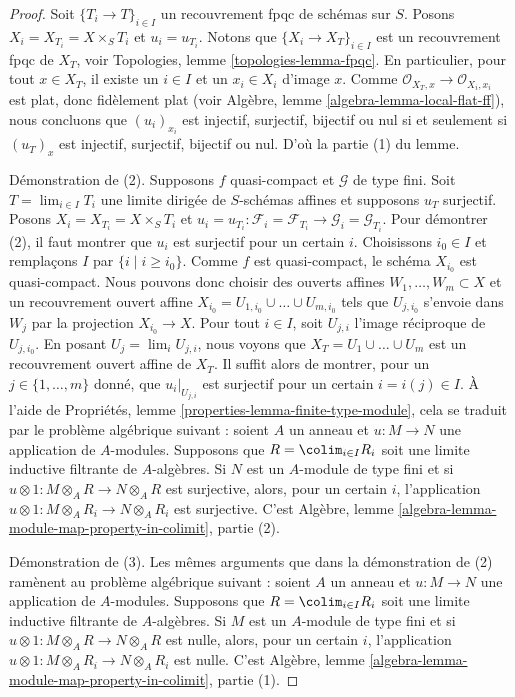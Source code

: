 \begin{proof}
Soit $\{T_i \to T\}_{i \in I}$ un recouvrement fpqc de schémas sur $S$.
Posons $X_i = X_{T_i} = X \times_S T_i$ et $u_i = u_{T_i}$.
Notons que $\{X_i \to X_T\}_{i \in I}$ est un recouvrement fpqc de $X_T$, voir
Topologies, lemme \ref{topologies-lemma-fpqc}.
En particulier, pour tout $x \in X_T$, il existe un $i \in I$
et un $x_i \in X_i$ d'image $x$. Comme
$\mathcal{O}_{X_T, x} \to \mathcal{O}_{X_i, x_i}$ est plat, donc
fidèlement plat (voir
Algèbre, lemme \ref{algebra-lemma-local-flat-ff}),
nous concluons que $(u_i)_{x_i}$ est injectif, surjectif, bijectif ou nul
si et seulement si $(u_T)_x$ est injectif, surjectif, bijectif ou nul.
D'où la partie (1) du lemme.

\medskip\noindent
Démonstration de (2). Supposons $f$ quasi-compact et $\mathcal{G}$ de type fini.
Soit $T = \lim_{i \in I} T_i$ une limite dirigée de $S$-schémas affines
et supposons $u_T$ surjectif.
Posons $X_i = X_{T_i} = X \times_S T_i$ et
$u_i = u_{T_i} : \mathcal{F}_i = \mathcal{F}_{T_i}
\to \mathcal{G}_i = \mathcal{G}_{T_i}$.
Pour démontrer (2), il faut montrer que $u_i$ est surjectif pour un certain $i$.
Choisissons $i_0 \in I$ et remplaçons $I$ par $\{i \mid i \geq i_0\}$.
Comme $f$ est quasi-compact, le schéma $X_{i_0}$ est quasi-compact.
Nous pouvons donc choisir des ouverts affines $W_1, \ldots, W_m \subset X$
et un recouvrement ouvert affine
$X_{i_0} = U_{1, i_0} \cup \ldots \cup U_{m, i_0}$ tels que
$U_{j, i_0}$ s'envoie dans $W_j$ par la projection $X_{i_0} \to X$.
Pour tout $i \in I$, soit $U_{j, i}$ l'image réciproque de $U_{j, i_0}$.
En posant $U_j = \lim_i U_{j, i}$, nous voyons que $X_T = U_1 \cup \ldots \cup U_m$
est un recouvrement ouvert affine de $X_T$. Il suffit alors de montrer, pour un
$j \in \{1, \ldots, m\}$ donné, que $u_i|_{U_{j, i}}$ est surjectif pour un certain
$i = i(j) \in I$. À l'aide de
Propriétés, lemme \ref{properties-lemma-finite-type-module},
cela se traduit par le problème algébrique suivant :
soient $A$ un anneau et $u : M \to N$ une application de $A$-modules.
Supposons que $R = \colim_{i \in I} R_i$ soit une limite inductive filtrante
de $A$-algèbres. Si $N$ est un $A$-module de type fini et si
$u \otimes 1 : M \otimes_A R \to N \otimes_A R$ est surjective, alors,
pour un certain $i$, l'application
$u \otimes 1 : M \otimes_A R_i \to N \otimes_A R_i$ est surjective.
C'est
Algèbre, lemme \ref{algebra-lemma-module-map-property-in-colimit}, partie (2).

\medskip\noindent
Démonstration de (3). Les mêmes arguments que dans la démonstration de (2)
ramènent au problème algébrique suivant :
soient $A$ un anneau et $u : M \to N$ une application de $A$-modules.
Supposons que $R = \colim_{i \in I} R_i$ soit une limite inductive filtrante
de $A$-algèbres. Si $M$ est un $A$-module de type fini et si
$u \otimes 1 : M \otimes_A R \to N \otimes_A R$ est nulle, alors,
pour un certain $i$, l'application
$u \otimes 1 : M \otimes_A R_i \to N \otimes_A R_i$ est nulle.
C'est
Algèbre, lemme \ref{algebra-lemma-module-map-property-in-colimit}, partie (1).


\end{proof}
